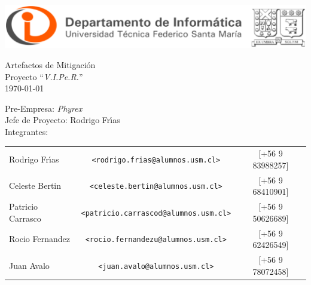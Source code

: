 \documentclass[letterpaper,12pt]{article} %
\numberwithin{equation}{section} %
\numberwithin{figure}{section} %
\numberwithin{table}{section} %
\begin{document}
\begin{titlepage} %
\thispagestyle{empty} %
\begin{center}
\includegraphics[scale=0.35]{logoUSM-DI.eps}
\end{center}

\vspace{3cm} %
\begin{center} %
  {
    \Huge Artefactos de Mitigaci\'on\\
    \huge Proyecto ``\emph{V.I.Pe.R.}''\\
    \normalsize\today
  }
\end{center}

\vspace{6cm}

\vfill
\begin{flushleft} %
Pre-Empresa: \emph{Phyrex}\\
Jefe de Proyecto: Rodrigo Fr\'{\i}as\\
Integrantes:
\begin{table}[hb]
  \begin{tabular}{lcc}
    Rodrigo Fr\'{\i}as & \texttt{\small <rodrigo.frias@alumnos.usm.cl>} & [+56 9 83988257] \\
    Celeste Bertin & \texttt{\small <celeste.bertin@alumnos.usm.cl>} &[+56 9 68410901]\\
    Patricio Carrasco &\texttt{\small <patricio.carrascod@alumnos.usm.cl>} &[+56 9 50626689]\\
    Rocio Fernandez &\texttt{\small <rocio.fernandezu@alumnos.usm.cl>} & [+56 9 62426549]\\
    Juan Avalo & \texttt{\small <juan.avalo@alumnos.usm.cl>} & [+56 9 78072458]\\
  \end{tabular}
\end{table}
\end{flushleft}
\end{titlepage}

\end{document}
